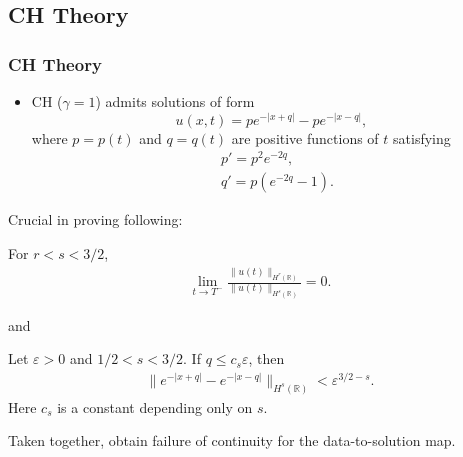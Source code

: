\documentclass{beamer}
\numberwithin{equation}{section}
\newcommand{\rr}{\mathbb{R}}
\newcommand{\ee}{\varepsilon}
\begin{document}
\subsection{CH Theory}
\begin{frame}
  \frametitle{CH Theory}
  \begin{itemize}
    \item
CH ($\gamma =1$) admits solutions of form
%
\begin{equation*}
  u(x,t)= p e^{-| x + q |} - p e^{-| x-q |},
\end{equation*}
%
where $p=p(t)$ and  $q=q(t)$ are positive functions of $t$
satisfying
%
\pause
\begin{align*}
  &p' = p^2 e^{-2q}, \\
  &q' = p (e^{-2q} -1).
\end{align*}
\end{itemize}
\pause
Crucial in proving following:
\end{frame}
\begin{frame}
  \begin{lemma}
  For $r < s < 3/2$,
  \begin{equation*}
    \begin{split}
      \lim_{t \to T^{-}}
      \frac{\|u(t)\|_{H^{r}(\rr)}}{\|u(t)\|_{H^{s}(\rr)}} = 0.
    \end{split}
  \end{equation*}
  \end{lemma}
  \pause
  and
  \begin{lemma}
  Let $ \ee >0$ and $ 1/2< s < 3/2$. If $q \le c_s \ee$, then 
  \begin{equation*}
    \label{peakon-antipeakon-Hs-bound}
    \begin{split}
      \|e^{-| x+ q |} - e^{-| x- q |} \|_{H^{s}(\rr)} < \ee^{3/2 - s}.
    \end{split}
  \end{equation*}
  Here $c_s$ is a constant depending only on $s$. 
\end{lemma}
\pause
Taken together, obtain failure of continuity for the data-to-solution map.

\end{frame}
\end{document}
